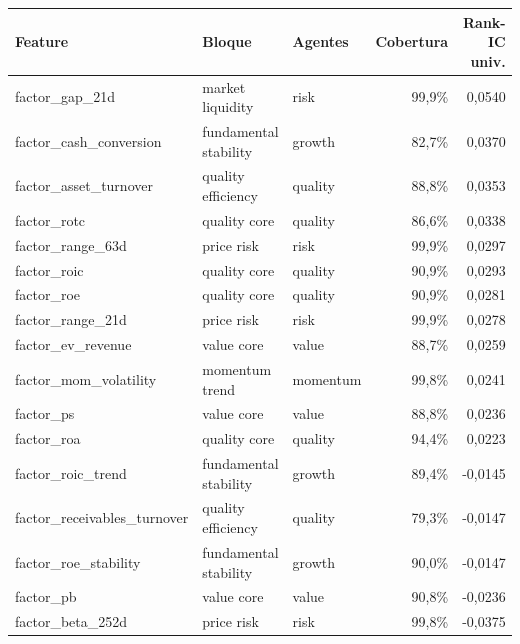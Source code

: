 \begin{tabular}{lllrr}
\toprule
Feature & Bloque & Agentes & Cobertura & Rank-IC univ. \\
\midrule
factor\_gap\_21d & market liquidity & risk & 99,9\% & 0,0540 \\
factor\_cash\_conversion & fundamental stability & growth & 82,7\% & 0,0370 \\
factor\_asset\_turnover & quality efficiency & quality & 88,8\% & 0,0353 \\
factor\_rotc & quality core & quality & 86,6\% & 0,0338 \\
factor\_range\_63d & price risk & risk & 99,9\% & 0,0297 \\
factor\_roic & quality core & quality & 90,9\% & 0,0293 \\
factor\_roe & quality core & quality & 90,9\% & 0,0281 \\
factor\_range\_21d & price risk & risk & 99,9\% & 0,0278 \\
factor\_ev\_revenue & value core & value & 88,7\% & 0,0259 \\
factor\_mom\_volatility & momentum trend & momentum & 99,8\% & 0,0241 \\
factor\_ps & value core & value & 88,8\% & 0,0236 \\
factor\_roa & quality core & quality & 94,4\% & 0,0223 \\
factor\_roic\_trend & fundamental stability & growth & 89,4\% & -0,0145 \\
factor\_receivables\_turnover & quality efficiency & quality & 79,3\% & -0,0147 \\
factor\_roe\_stability & fundamental stability & growth & 90,0\% & -0,0147 \\
factor\_pb & value core & value & 90,8\% & -0,0236 \\
factor\_beta\_252d & price risk & risk & 99,8\% & -0,0375 \\
\bottomrule
\end{tabular}
